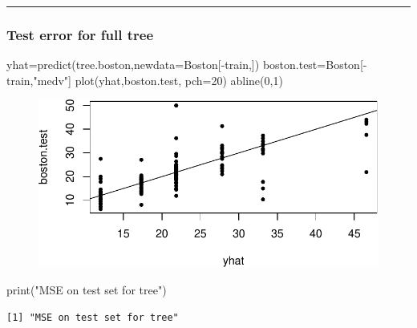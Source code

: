 \documentclass[
  letterpaper,
  DIV=11,
  numbers=noendperiod]{scrartcl}
\newenvironment{Shaded}{\begin{snugshade}}{\end{snugshade}}
\newcommand{\AttributeTok}[1]{\textcolor[rgb]{0.40,0.45,0.13}{#1}}
\newcommand{\DecValTok}[1]{\textcolor[rgb]{0.68,0.00,0.00}{#1}}
\newcommand{\FunctionTok}[1]{\textcolor[rgb]{0.28,0.35,0.67}{#1}}
\newcommand{\NormalTok}[1]{\textcolor[rgb]{0.00,0.23,0.31}{#1}}
\newcommand{\OtherTok}[1]{\textcolor[rgb]{0.00,0.23,0.31}{#1}}
\newcommand{\SpecialCharTok}[1]{\textcolor[rgb]{0.37,0.37,0.37}{#1}}
\newcommand{\StringTok}[1]{\textcolor[rgb]{0.13,0.47,0.30}{#1}}
\begin{document}
\begin{center}\rule{0.5\linewidth}{0.5pt}\end{center}

\hypertarget{test-error-for-full-tree}{%
\subsubsection{Test error for full
tree}\label{test-error-for-full-tree}}

\begin{Shaded}
\begin{Highlighting}[]
\NormalTok{yhat}\OtherTok{=}\FunctionTok{predict}\NormalTok{(tree.boston,}\AttributeTok{newdata=}\NormalTok{Boston[}\SpecialCharTok{{-}}\NormalTok{train,])}
\NormalTok{boston.test}\OtherTok{=}\NormalTok{Boston[}\SpecialCharTok{{-}}\NormalTok{train,}\StringTok{"medv"}\NormalTok{]}
\FunctionTok{plot}\NormalTok{(yhat,boston.test, }\AttributeTok{pch=}\DecValTok{20}\NormalTok{)}
\FunctionTok{abline}\NormalTok{(}\DecValTok{0}\NormalTok{,}\DecValTok{1}\NormalTok{)}
\end{Highlighting}
\end{Shaded}

\begin{figure}[H]

{\centering \includegraphics{L13_files/figure-pdf/unnamed-chunk-10-1.pdf}

}

\end{figure}

\begin{Shaded}
\begin{Highlighting}[]
\FunctionTok{print}\NormalTok{(}\StringTok{"MSE on test set for tree"}\NormalTok{)}
\end{Highlighting}
\end{Shaded}

\begin{verbatim}
[1] "MSE on test set for tree"
\end{verbatim}
\end{document}

